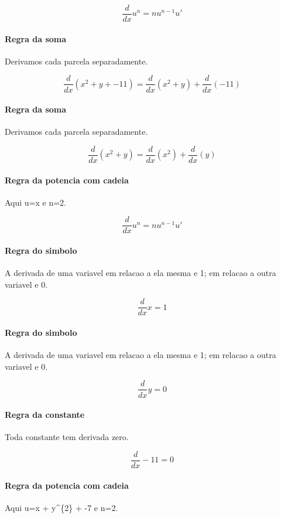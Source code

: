 \documentclass[11pt,a4paper]{article}
\begin{document}
\[
\frac{d}{dx}u^n=n u^{n-1}u'
\]

\paragraph{Regra da soma} Derivamos cada parcela separadamente.

\[
\frac{d}{dx}\left(x^{2} + y + -11\right)=\frac{d}{dx}\left(x^{2} + y\right)+\frac{d}{dx}\left(-11\right)
\]

\paragraph{Regra da soma} Derivamos cada parcela separadamente.

\[
\frac{d}{dx}\left(x^{2} + y\right)=\frac{d}{dx}\left(x^{2}\right)+\frac{d}{dx}\left(y\right)
\]

\paragraph{Regra da potencia com cadeia} Aqui u=x e n=2.

\[
\frac{d}{dx}u^n=n u^{n-1}u'
\]

\paragraph{Regra do simbolo} A derivada de uma variavel em relacao a ela mesma e 1; em relacao a outra variavel e 0.

\[
\frac{d}{dx}x=1
\]

\paragraph{Regra do simbolo} A derivada de uma variavel em relacao a ela mesma e 1; em relacao a outra variavel e 0.

\[
\frac{d}{dx}y=0
\]

\paragraph{Regra da constante} Toda constante tem derivada zero.

\[
\frac{d}{dx}-11=0
\]

\paragraph{Regra da potencia com cadeia} Aqui u=x + y\textasciicircum{}\{2\} + -7 e n=2.
\end{document}
